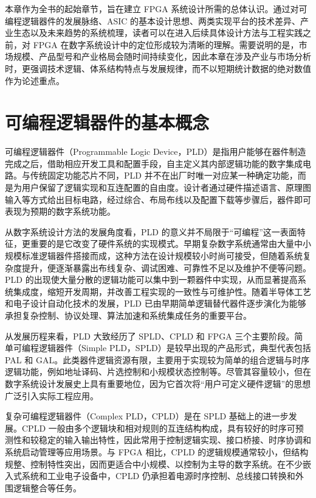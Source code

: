 本章作为全书的起始章节，旨在建立 FPGA
系统设计所需的总体认识。通过对可编程逻辑器件的发展脉络、ASIC
的基本设计思想、两类实现平台的技术差异、产业生态以及未来趋势的系统梳理，读者可以在进入后续具体设计方法与工程实践之前，对
FPGA
在数字系统设计中的定位形成较为清晰的理解。需要说明的是，市场规模、产品型号和产业格局会随时间持续变化，因此本章在涉及产业与市场分析时，更强调技术逻辑、体系结构特点与发展规律，而不以短期统计数据的绝对数值作为论述重点。

\section{可编程逻辑器件的基本概念}\label{ux53efux7f16ux7a0bux903bux8f91ux5668ux4ef6ux7684ux57faux672cux6982ux5ff5}

可编程逻辑器件（Programmable Logic
Device，PLD）是指用户能够在器件制造完成之后，借助相应开发工具和配置手段，自主定义其内部逻辑功能的数字集成电路。与传统固定功能芯片不同，PLD
并不在出厂时唯一对应某一种确定功能，而是为用户保留了逻辑实现和互连配置的自由度。设计者通过硬件描述语言、原理图输入等方式给出目标电路，经过综合、布局布线以及配置下载等步骤后，器件即可表现为预期的数字系统功能。

从数字系统设计方法的发展角度看，PLD
的意义并不局限于``可编程''这一表面特征，更重要的是它改变了硬件系统的实现模式。早期复杂数字系统通常由大量中小规模标准逻辑器件搭接而成，这种方法在设计规模较小时尚可接受，但随着系统复杂度提升，便逐渐暴露出布线复杂、调试困难、可靠性不足以及维护不便等问题。PLD
的出现使大量分散的逻辑功能可以集中到一颗器件中实现，从而显著提高系统集成度，缩短开发周期，并改善工程实现的一致性与可维护性。随着半导体工艺和电子设计自动化技术的发展，PLD
已由早期简单逻辑替代器件逐步演化为能够承担复杂控制、协议处理、算法加速和系统集成任务的重要平台。

从发展历程来看，PLD 大致经历了 SPLD、CPLD 和 FPGA
三个主要阶段。简单可编程逻辑器件（Simple
PLD，SPLD）是较早出现的产品形式，典型代表包括 PAL 和
GAL。此类器件逻辑资源有限，主要用于实现较为简单的组合逻辑与时序逻辑功能，例如地址译码、片选控制和小规模状态控制等。尽管其容量较小，但在数字系统设计发展史上具有重要地位，因为它首次将``用户可定义硬件逻辑''的思想广泛引入实际工程应用。

复杂可编程逻辑器件（Complex PLD，CPLD）是在 SPLD
基础上的进一步发展。CPLD
一般由多个逻辑块和相对规则的互连结构构成，具有较好的时序可预测性和较稳定的输入输出特性，因此常用于控制逻辑实现、接口桥接、时序协调和系统启动管理等应用场景。与
FPGA 相比，CPLD
的逻辑规模通常较小，但结构规整、控制特性突出，因而更适合中小规模、以控制为主导的数字系统。在不少嵌入式系统和工业电子设备中，CPLD
仍承担着电源时序控制、总线接口转换和外围逻辑整合等任务。

